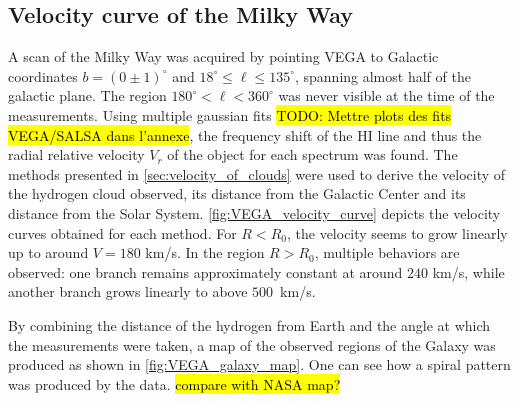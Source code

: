 \subsection{Velocity curve of the Milky Way}
A scan of the Milky Way was acquired by pointing VEGA to Galactic coordinates $b = (0\pm 1)^\circ$ and $18^\circ \leq \ell \leq 135^\circ$, spanning almost half of the galactic plane. The region $180^\circ < \ell < 360^\circ$ was never visible at the time of the measurements.
Using multiple gaussian fits \hl{TODO: Mettre plots des fits VEGA/SALSA dans l'annexe}, the frequency shift of the HI line and thus the radial relative velocity $V_r$ of the object for each spectrum was found. The methods presented in \autoref{sec:velocity_of_clouds} were used to derive the velocity of the hydrogen cloud observed, its distance from the Galactic Center and its distance from the Solar System.
\autoref{fig:VEGA_velocity_curve} depicts the velocity curves obtained for each method. For $R < R_0$, the velocity seems to grow linearly up to around $V=180$ km/s. In the region $R > R_0$, multiple behaviors are observed: one branch remains approximately constant at around $240$ km/s, while another branch grows linearly to above \mbox{$500$ km/s.}

By combining the distance of the hydrogen from Earth and the angle at which the measurements were taken, a map of the observed regions of the Galaxy was produced as shown in \autoref{fig:VEGA_galaxy_map}. One can see how a spiral pattern was produced by the data. \hl{compare with NASA map?}


